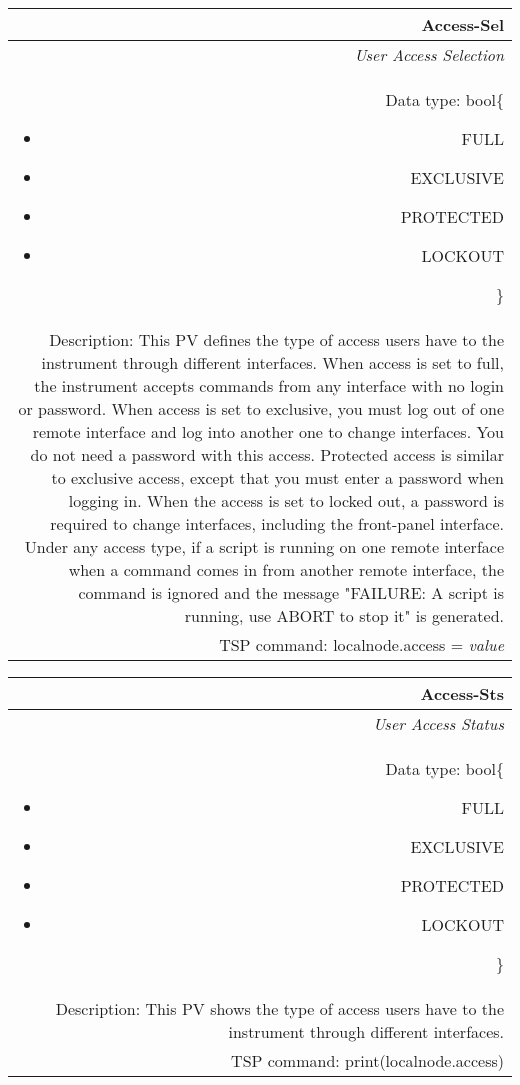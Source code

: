\documentclass[openany]{article}
\begin{document}
		\begin{tabular}{N}
			\hline
			\bfseries Access-Sel\label{pv:access-sel} \\ \hline
			\emph{User Access Selection} \\
			Data type: bool\{\begin{itemize}[noitemsep]
				\small
				\item[] FULL
				\item[] EXCLUSIVE
				\item[] PROTECTED
				\item[] LOCKOUT
			\end{itemize}\} \\
			Description: This PV defines the type of access users have to the instrument through different interfaces. When access is set to full, the instrument accepts commands from any interface with no login or password. When access is set to exclusive, you must log out of one remote interface and log into another one to change interfaces. You do not need a password with this access. Protected access is similar to exclusive access, except that you must enter a password when logging in. When the access is set to locked out, a password is required to change interfaces, including the front-panel interface. Under any access type, if a script is running on one remote interface when a command comes in from another remote interface, the command is ignored and the message "FAILURE: A script is running, use ABORT to stop it" is generated. \\
			TSP command: localnode.access = \emph{value}
		\end{tabular}

		\begin{tabular}{N}
			\hline
			\bfseries Access-Sts\label{pv:access-sts} \\ \hline
			\emph{User Access Status} \\
			Data type: bool\{\begin{itemize}[noitemsep]
				\small
				\item[] FULL
				\item[] EXCLUSIVE
				\item[] PROTECTED
				\item[] LOCKOUT
			\end{itemize}\} \\
			Description: This PV shows the type of access users have to the instrument through different interfaces. \\
			TSP command: print(localnode.access)
		\end{tabular}
\end{document}
